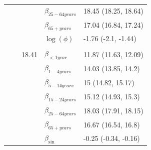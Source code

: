 \documentclass[a4paper,twoside,11pt]{report} %
\theoremstyle{definition}
\theoremstyle{definition}
\theoremstyle{definition}
\theoremstyle{definition}
\theoremstyle{remark}
\begin{document}
\begin{longtable}[t]{llrll}
\hspace{1em}\hspace{1em} &  &  & $\beta_{25-64 years}$ & 18.45 (18.25, 18.64)\\

\hspace{1em}\hspace{1em} &  &  & $\beta_{65+ years}$ & 17.04 (16.84, 17.24)\\

\hspace{1em}\hspace{1em} &  &  & $\log(\phi)$ & -1.76 (-2.1, -1.44)\\
\cmidrule{2-5}
\addlinespace[0.3em]
\multicolumn{5}{l}{\begin{math}\log(\lambda_{it})=\beta(ageGroup_{i})+\beta_{\sin}\sin\Big(\frac{\pi\cdot \tau_{t}}{6}\Big) + \beta_{\cos} \cos\Big(\frac{\pi \cdot \tau_{t}}{6}\Big)+\log(n_{it})\end{math}}\\
\hspace{1em}\hspace{1em} &  & 18.41 & $\beta_{<1 year}$ & 11.87 (11.63, 12.09)\\

\hspace{1em}\hspace{1em} &  &  & $\beta_{1-4 years}$ & 14.03 (13.85, 14.2)\\

\hspace{1em}\hspace{1em} &  &  & $\beta_{5-14 years}$ & 15 (14.82, 15.17)\\

\hspace{1em}\hspace{1em} &  &  & $\beta_{15-24 years}$ & 15.12 (14.93, 15.3)\\

\hspace{1em}\hspace{1em} &  &  & $\beta_{25-64 years}$ & 18.03 (17.91, 18.15)\\

\hspace{1em}\hspace{1em} &  &  & $\beta_{65+ years}$ & 16.67 (16.54, 16.8)\\

\hspace{1em}\hspace{1em} &  &  & $\beta_{\sin}$ & -0.25 (-0.34, -0.16)\\


\end{longtable}
\end{document}
